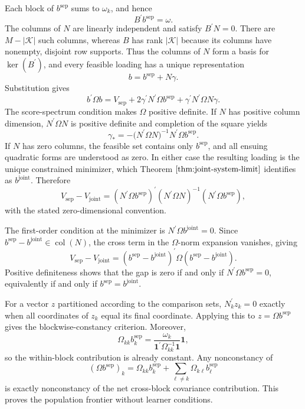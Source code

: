 Each block of \(b^{\mathrm{sep}}\) sums to \(\omega_k\), and hence
\[
 B^{\prime}b^{\mathrm{sep}}=\omega.
\]
The columns of \(N\) are linearly independent and satisfy \(B^{\prime}N=0\). There are \(M-|\mathcal K|\) such columns, whereas \(B\) has rank \(|\mathcal K|\) because its columns have nonempty, disjoint row supports. Thus the columns of \(N\) form a basis for \(\ker(B^{\prime})\), and every feasible loading has a unique representation
\[
 b=b^{\mathrm{sep}}+N\gamma.
\]
Substitution gives
\[
 b^{\prime}\Omega b
 =V_{\mathrm{sep}}+2\gamma^{\prime}N^{\prime}\Omega b^{\mathrm{sep}}
 +\gamma^{\prime}N^{\prime}\Omega N\gamma.
\]
The score-spectrum condition makes \(\Omega\) positive definite. If \(N\) has positive column dimension, \(N^{\prime}\Omega N\) is positive definite and completion of the square yields
\[
 \gamma_*=-\bigl(N^{\prime}\Omega N\bigr)^{-1}N^{\prime}\Omega b^{\mathrm{sep}}.
\]
If \(N\) has zero columns, the feasible set contains only \(b^{\mathrm{sep}}\), and all ensuing quadratic forms are understood as zero. In either case the resulting loading is the unique constrained minimizer, which Theorem \(\ref{thm:joint-system-limit}\) identifies as \(b^{\mathrm{joint}}\). Therefore
\[
 V_{\mathrm{sep}}-V_{\mathrm{joint}}
 =(N^{\prime}\Omega b^{\mathrm{sep}})^{\prime}
 (N^{\prime}\Omega N)^{-1}
 (N^{\prime}\Omega b^{\mathrm{sep}}),
\]
with the stated zero-dimensional convention.

The first-order condition at the minimizer is \(N^{\prime}\Omega b^{\mathrm{joint}}=0\). Since \(b^{\mathrm{sep}}-b^{\mathrm{joint}}\in\operatorname{col}(N)\), the cross term in the \(\Omega\)-norm expansion vanishes, giving
\[
 V_{\mathrm{sep}}-V_{\mathrm{joint}}
 =(b^{\mathrm{sep}}-b^{\mathrm{joint}})^{\prime}
   \Omega(b^{\mathrm{sep}}-b^{\mathrm{joint}}).
\]
Positive definiteness shows that the gap is zero if and only if \(N^{\prime}\Omega b^{\mathrm{sep}}=0\), equivalently if and only if \(b^{\mathrm{sep}}=b^{\mathrm{joint}}\).

For a vector \(z\) partitioned according to the comparison sets, \(N_k^{\prime}z_k=0\) exactly when all coordinates of \(z_k\) equal its final coordinate. Applying this to \(z=\Omega b^{\mathrm{sep}}\) gives the blockwise-constancy criterion. Moreover,
\[
 \Omega_{kk}b_k^{\mathrm{sep}}
 =\frac{\omega_k}{\mathbf 1^{\prime}\Omega_{kk}^{-1}\mathbf 1}\mathbf 1,
\]
so the within-block contribution is already constant. Any nonconstancy of
\[
 (\Omega b^{\mathrm{sep}})_k
 =\Omega_{kk}b_k^{\mathrm{sep}}
  +\sum_{\ell\ne k}\Omega_{k\ell}b_\ell^{\mathrm{sep}}
\]
is exactly nonconstancy of the net cross-block covariance contribution. This proves the population frontier without learner conditions.

